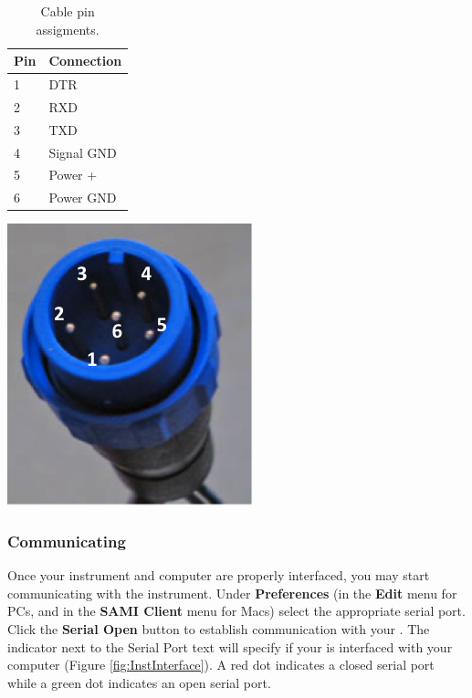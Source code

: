 \begin{table}[ht]
\RawFloats
\begin{minipage}[b]{0.5\hsize}
\centering
   \begin{tabular}{l l}
       \toprule
       Pin & Connection \\
       \midrule
       1 & DTR \\
       2 & RXD \\   
       3 & TXD \\
       4 & Signal GND \\
       5 & Power + \\
       6 & Power GND \\
       \bottomrule
    \end{tabular}
    \caption{Cable pin assigments.}
    \label{tab:BulginPins}
\end{minipage}
\hfill
\begin{minipage}[b]{0.5\hsize}
\centering
\includegraphics[scale=0.5]{figs/Bulgin_labeled.png}
\label{fig:BulginCable}
\end{minipage}
\end{table}

\fi


\subsubsection{Communicating}

Once your instrument and computer are properly interfaced, you may start communicating with the instrument. Under \textbf{Preferences} (in the \textbf{Edit} menu for PCs, and in the \textbf{SAMI Client} menu for Macs) select the appropriate serial port. Click the \textbf{Serial Open} button to establish communication with your \instType{}. The indicator next to the Serial Port text will specify if your \instType{} is interfaced with your computer (Figure \ref{fig:InstInterface}). A red dot indicates a closed serial port while a green dot indicates an open serial port. 

